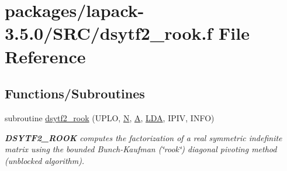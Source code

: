 \hypertarget{dsytf2__rook_8f}{}\section{packages/lapack-\/3.5.0/\+S\+R\+C/dsytf2\+\_\+rook.f File Reference}
\label{dsytf2__rook_8f}
\subsection*{Functions/\+Subroutines}
\begin{DoxyCompactItemize}
\item 
subroutine \hyperlink{group__doubleSYcomputational_gaeb74d011f4a363f05af734377de1c214}{dsytf2\+\_\+rook} (U\+P\+L\+O, \hyperlink{polmisc_8c_a0240ac851181b84ac374872dc5434ee4}{N}, \hyperlink{classA}{A}, \hyperlink{example__user_8c_ae946da542ce0db94dced19b2ecefd1aa}{L\+D\+A}, I\+P\+I\+V, I\+N\+F\+O)
\begin{DoxyCompactList}\small\item\em {\bfseries D\+S\+Y\+T\+F2\+\_\+\+R\+O\+O\+K} computes the factorization of a real symmetric indefinite matrix using the bounded Bunch-\/\+Kaufman (\char`\"{}rook\char`\"{}) diagonal pivoting method (unblocked algorithm). \end{DoxyCompactList}\end{DoxyCompactItemize}
